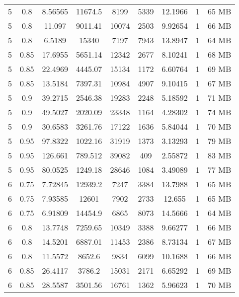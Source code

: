 \begin{longtable}{c|c|c|c|c|c|c|c|c}
  \hline
  5   &  0.8   &  8.56565  &  11674.5  &  8199   &  5339  &  12.1966  &  1  &  65  MB \\
  5   &  0.8   &  11.097   &  9011.41  &  10074  &  2503  &  9.92654  &  1  &  66  MB \\
  5   &  0.8   &  6.5189   &  15340    &  7197   &  7943  &  13.8947  &  1  &  64  MB \\
  \hline
  5   &  0.85  &  17.6955  &  5651.14  &  12342  &  2677  &  8.10241  &  1  &  68  MB \\
  5   &  0.85  &  22.4969  &  4445.07  &  15134  &  1172  &  6.60764  &  1  &  69  MB \\
  5   &  0.85  &  13.5184  &  7397.31  &  10984  &  4907  &  9.10415  &  1  &  67  MB \\
  \hline
  5   &  0.9   &  39.2715  &  2546.38  &  19283  &  2248  &  5.18592  &  1  &  71  MB \\
  5   &  0.9   &  49.5027  &  2020.09  &  23348  &  1164  &  4.28302  &  1  &  74  MB \\
  5   &  0.9   &  30.6583  &  3261.76  &  17122  &  1636  &  5.84044  &  1  &  70  MB \\
  \hline
  5   &  0.95  &  97.8322  &  1022.16  &  31919  &  1373  &  3.13293  &  1  &  79  MB \\
  5   &  0.95  &  126.661  &  789.512  &  39082  &  409   &  2.55872  &  1  &  83  MB \\
  5   &  0.95  &  80.0525  &  1249.18  &  28646  &  1084  &  3.49089  &  1  &  77  MB \\
  \hline
  6   &  0.75  &  7.72845  &  12939.2  &  7247   &  3384  &  13.7988  &  1  &  65  MB \\
  6   &  0.75  &  7.93585  &  12601    &  7902   &  2733  &  12.655   &  1  &  65  MB \\
  6   &  0.75  &  6.91809  &  14454.9  &  6865   &  8073  &  14.5666  &  1  &  64  MB \\
  \hline
  6   &  0.8   &  13.7748  &  7259.65  &  10349  &  3388  &  9.66277  &  1  &  66  MB \\
  6   &  0.8   &  14.5201  &  6887.01  &  11453  &  2386  &  8.73134  &  1  &  67  MB \\
  6   &  0.8   &  11.5572  &  8652.6   &  9834   &  6099  &  10.1688  &  1  &  66  MB \\
  \hline
  6   &  0.85  &  26.4117  &  3786.2   &  15031  &  2171  &  6.65292  &  1  &  69  MB \\
  6   &  0.85  &  28.5587  &  3501.56  &  16761  &  1362  &  5.96623  &  1  &  70  MB \\

\end{longtable}
